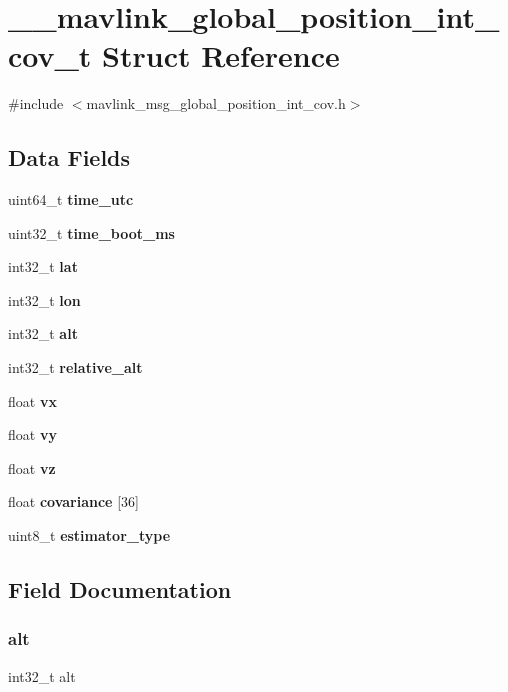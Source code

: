 \section{\+\_\+\+\_\+mavlink\+\_\+global\+\_\+position\+\_\+int\+\_\+cov\+\_\+t Struct Reference}
\label{struct____mavlink__global__position__int__cov__t}


{\ttfamily \#include $<$mavlink\+\_\+msg\+\_\+global\+\_\+position\+\_\+int\+\_\+cov.\+h$>$}

\subsection*{Data Fields}
\begin{DoxyCompactItemize}
\item 
uint64\+\_\+t \textbf{ time\+\_\+utc}
\item 
uint32\+\_\+t \textbf{ time\+\_\+boot\+\_\+ms}
\item 
int32\+\_\+t \textbf{ lat}
\item 
int32\+\_\+t \textbf{ lon}
\item 
int32\+\_\+t \textbf{ alt}
\item 
int32\+\_\+t \textbf{ relative\+\_\+alt}
\item 
float \textbf{ vx}
\item 
float \textbf{ vy}
\item 
float \textbf{ vz}
\item 
float \textbf{ covariance} [36]
\item 
uint8\+\_\+t \textbf{ estimator\+\_\+type}
\end{DoxyCompactItemize}


\subsection{Field Documentation}
\mbox{\label{struct____mavlink__global__position__int__cov__t_a677cbc2ca7dc4e9f0516bd42110f0062}} 
\subsubsection{alt}
{\footnotesize\ttfamily int32\+\_\+t alt}

